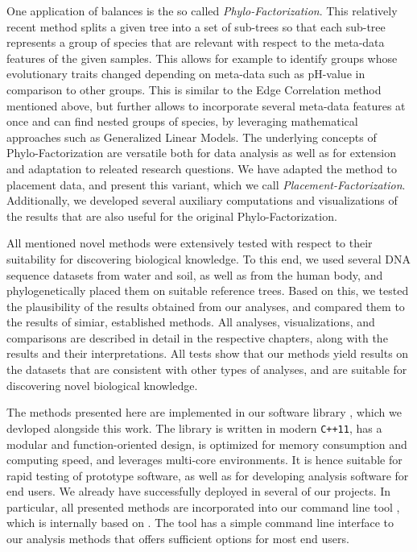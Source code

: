 One application of balances is the so called \emph{Phylo-Factorization}.
This relatively recent method splits a given tree into a set of sub-trees
so that each sub-tree represents a group of species that are relevant with respect to the meta-data features
of the given samples.
This allows for example to identify groups whose evolutionary traits changed depending on meta-data such as pH-value
in comparison to other groups.
This is similar to the Edge Correlation method mentioned above,
but further allows to incorporate several meta-data features at once and can find nested groups of species,
by leveraging mathematical approaches such as Generalized Linear Models.
The underlying concepts of Phylo-Factorization are versatile both for data analysis
as well as for extension and adaptation to releated research questions.
We have adapted the method to placement data, and present this variant, which we call \emph{Placement-Factorization}.
Additionally, we developed several auxiliary computations and visualizations of the results
that are also useful for the original Phylo-Factorization.

All mentioned novel methods were extensively tested with respect to their suitability for discovering biological knowledge.
To this end, we used several DNA sequence datasets from water and soil, as well as from the human body,
and phylogenetically placed them on suitable reference trees.
Based on this, we tested the plausibility of the results obtained from our analyses,
and compared them to the results of simiar, established methods.
All analyses, visualizations, and comparisons are described in detail in the respective chapters,
along with the results and their interpretations.
All tests show that our methods yield results on the datasets that are consistent with other types of analyses,
and are suitable for discovering novel biological knowledge.

The methods presented here are implemented in our software library ,
which we devloped alongside this work.
The library is written in modern \texttt{C++11}, has a modular and function-oriented design,
is optimized for memory consumption and computing speed, and leverages multi-core environments.
It is hence suitable for rapid testing of prototype software, as well as for developing analysis software for end users.
We already have successfully deployed  in several of our projects.
In particular, all presented methods are incorporated into our command line tool ,
which is internally based on .
The tool has a simple command line interface to our analysis methods that offers sufficient options for most end users.

